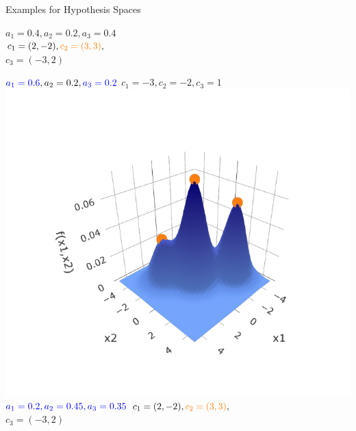 \documentclass[11pt,compress,t,notes=noshow, xcolor=table]{beamer}
\begin{document}
\begin{vbframe}{Examples for Hypothesis Spaces}
\begin{minipage}{0.33\textwidth}
\begin{center}
    $a_1 = 0.4, a_2 = 0.2, a_3 = 0.4$ \\
    $c_1 = (2,-2), \textcolor{orange}{c_2 = (3,3)},$ \\
    $c_3 = (-3,2)$
  \end{center}
\end{minipage}%
\begin{minipage}{0.33\textwidth}
  \begin{center}
    $\textcolor{blue}{a_1 = 0.6}, a_2 = 0.2, \textcolor{blue}{a_3 = 0.2}$
    $c_1 = -3, c_2 = -2, c_3 = 1$
    \includegraphics[width=\textwidth]{figure/hs-rbf-network-3d-3.pdf}
    $\textcolor{blue}{a_1 = 0.2, a_2 = 0.45, a_3 = 0.35}$
    $c_1 = (2,-2), \textcolor{orange}{c_2 = (3,3)},$ \\
    $c_3 = (-3,2)$
  \end{center}
\end{minipage}

\normalsize


\end{vbframe}
\end{document}
